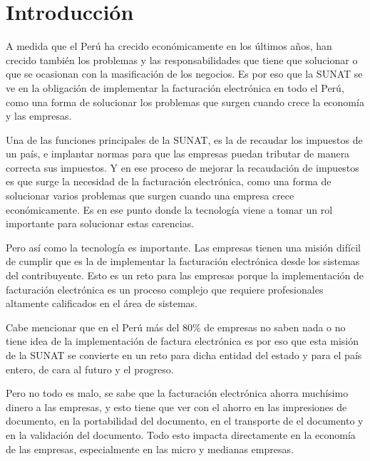 \chapter*{Introducción} 
A medida que el Perú ha crecido económicamente en los últimos años, han crecido también los problemas y las responsabilidades que tiene que solucionar o que se ocasionan con la masificación de los negocios. Es por eso que la SUNAT se ve en la obligación de implementar la facturación electrónica en todo el Perú, como una forma de solucionar los problemas que surgen cuando crece la economía y las empresas.

Una de las funciones principales de la SUNAT, es la de recaudar los impuestos de un país, e implantar normas para que las empresas puedan tributar de manera correcta sus impuestos. Y en ese proceso de mejorar la recaudación de impuestos es que surge la necesidad de la facturación electrónica, como una forma de solucionar varios problemas que surgen cuando una empresa crece económicamente. Es en ese punto donde la tecnología viene a tomar un rol importante para solucionar estas carencias.

Pero así como la tecnología es importante. Las empresas tienen una misión difícil de cumplir que es la de implementar la facturación electrónica desde los sistemas del contribuyente. Esto es un reto para las empresas porque la implementación de facturación electrónica es un proceso complejo que requiere profesionales altamente calificados en el área de sistemas. 

Cabe mencionar que en el Perú más del 80\% de empresas no saben nada o no tiene idea de la implementación de factura electrónica es por eso que esta misión de la SUNAT se convierte en un reto para dicha entidad del estado y para el país entero, de cara al futuro y el progreso. 

Pero no todo es malo, se sabe que la facturación electrónica ahorra muchísimo dinero a las empresas, y esto tiene que ver con el ahorro en las impresiones de documento, en la portabilidad del documento, en el transporte de el documento y en la validación del documento. Todo esto impacta directamente en la economía de las empresas, especialmente en las micro y medianas empresas. 

